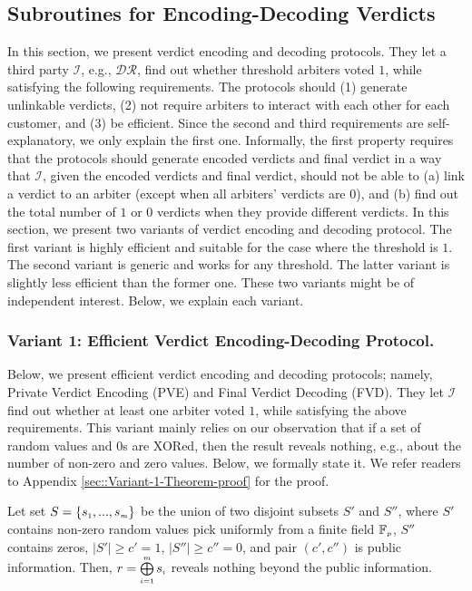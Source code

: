 
\subsection{Subroutines for  Encoding-Decoding Verdicts}\label{sec::Encoding-Decoding-Verdicts}


In this section, we present verdict encoding and decoding protocols. They let a third party $\mathcal{I}$, e.g., $\mathcal{DR}$, find out whether threshold  arbiters voted $1$, while satisfying the following  requirements.  The protocols should (1) generate unlinkable verdicts, (2)  not require arbiters to interact with each other for each customer, and (3) be  efficient. Since the second and third requirements are self-explanatory,  we only explain the first one.  Informally, the first property requires  that the protocols should generate encoded verdicts and final verdict in a way that $\mathcal{I}$,  given the encoded verdicts and final verdict, should not be able to (a)   link a  verdict to an arbiter (except when all arbiters' verdicts are $0$), and (b) find out the total number of $1$ or $0$ verdicts when they provide different verdicts.  In this section, we present two variants of verdict encoding and decoding protocol. The first variant is highly efficient and suitable for the case where the threshold is $1$. The second variant is  generic and works for any threshold. The latter variant is slightly less efficient than the former one. These two variants might be of independent interest. Below, we explain each variant. 


\subsubsection{Variant 1:  Efficient Verdict  Encoding-Decoding Protocol.}


Below, we present  efficient verdict encoding and decoding protocols; namely, Private Verdict Encoding (PVE) and Final Verdict Decoding (FVD). They  let $\mathcal{I}$ find out whether at least one arbiter voted $1$, while satisfying the above requirements.   This variant  mainly relies on our observation that   if   a set of random values and $0$s are XORed, then the result   reveals nothing, e.g.,  about the number of non-zero and  zero values. Below, we formally state it.  We refer readers to Appendix \ref{sec::Variant-1-Theorem-proof} for the proof.

\begin{theorem}\label{set-xor}
Let set $S=\{s_{\scriptscriptstyle 1},..., s_{\scriptscriptstyle m}\}$ be the union of  two disjoint subsets $S'$ and $S''$, where $S'$ contains non-zero random values pick uniformly  from a finite field $\mathbb{F}_{\scriptscriptstyle p}$, $S''$ contains zeros, $|S'|\geq c'=1$, $|S''|\geq c''=0$, and pair $(c',c'')$ is public information. Then, $r= \bigoplus\limits^{\scriptscriptstyle m}_{\scriptscriptstyle i=1} s_{\scriptscriptstyle i}$ reveals nothing beyond the public information.  
\end{theorem}

